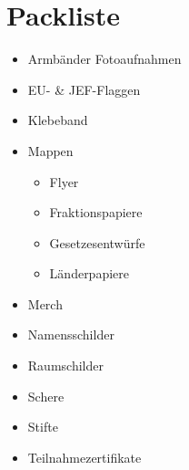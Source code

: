 \documentclass{article}
\begin{document}
    \section{Packliste}
    \begin{itemize}
        \item Armbänder Fotoaufnahmen
        \item EU- \& JEF-Flaggen
        \item Klebeband
        \item Mappen
        \begin{itemize}
			\item Flyer
			\item Fraktionspapiere
			\item Gesetzesentwürfe
			\item Länderpapiere
        \end{itemize}
        \item Merch
        \item Namensschilder
        \item Raumschilder
        \item Schere
        \item Stifte        
        \item Teilnahmezertifikate
    \end{itemize}
\end{document}
